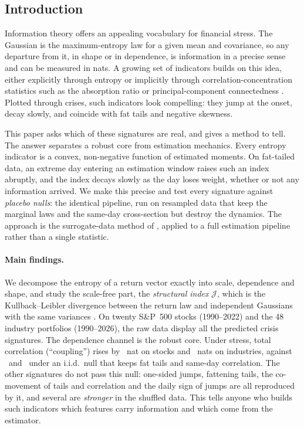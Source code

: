 \documentclass[12pt]{article}
\theoremstyle{definition}
\theoremstyle{remark}
\newcommand{\JJ}{\mathcal{J}}
\begin{document}
\begin{doublespace}

\section{Introduction}
\label{sec:intro}

Information theory offers an appealing vocabulary for financial stress. The
Gaussian is the maximum-entropy law for a given mean and covariance, so any
departure from it, in shape or in dependence, is information in a precise
sense and can be measured in nats. A growing set of indicators builds on this
idea, either explicitly through entropy or implicitly through
correlation-concentration statistics such as the absorption ratio
\citep{kritzman2011} or principal-component connectedness
\citep{billio2012}. Plotted through crises, such indicators look compelling:
they jump at the onset, decay slowly, and coincide with fat tails and negative
skewness.

This paper asks which of these signatures are real, and gives a method to
tell. The answer separates a robust core from estimation mechanics. Every entropy indicator is a convex,
non-negative function of estimated moments. On fat-tailed data, an extreme day
entering an estimation window raises such an index abruptly, and the index
decays slowly as the day loses weight, whether or not any information arrived.
We make this precise and test every signature against \emph{placebo nulls}:
the identical pipeline, run on resampled data that keep the marginal laws and
the same-day cross-section but destroy the dynamics. The approach is the
surrogate-data method of \citet{theiler1992}, applied to a full estimation
pipeline rather than a single statistic.

\paragraph{Main findings.} We decompose the entropy of a return vector exactly
into scale, dependence and shape, and study the scale-free part, the
\emph{structural index} $\JJ$, which is the Kullback--Leibler divergence
between the return law and independent Gaussians with the same variances
\citep{cardoso2003}. On twenty S\&P~500 stocks (1990--2022) and the 48
\citet{french2026} industry portfolios (1990--2026), the raw data display all
the predicted crisis signatures. The dependence channel is the robust core.
Under stress, total correlation (``coupling'') rises by \qCplSpObs~nat on stocks
and \qCplFfObs~nats on industries, against \qCplSpIid\ and \qCplFfIid\ under an
i.i.d.\ null that keeps fat tails and same-day correlation. The other
signatures do not pass this null: one-sided jumps, fattening tails, the
co-movement of tails and correlation and the daily sign of jumps are all
reproduced by it, and several are \emph{stronger} in the shuffled data. This
tells anyone who builds such indicators which features carry information and
which come from the estimator.


\end{doublespace}
\end{document}
